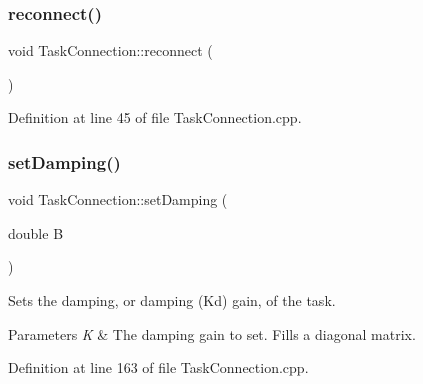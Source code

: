 \hypertarget{classocra__recipes_1_1TaskConnection_a416154f1cd736647003442d905b9862e}{}\label{classocra__recipes_1_1TaskConnection_a416154f1cd736647003442d905b9862e} 
\subsubsection{\texorpdfstring{reconnect()}{reconnect()}}
{\footnotesize\ttfamily void Task\+Connection\+::reconnect (\begin{DoxyParamCaption}{ }\end{DoxyParamCaption})}



Definition at line 45 of file Task\+Connection.\+cpp.

\hypertarget{classocra__recipes_1_1TaskConnection_a4f9c4b7b99c41c817b5c9448464b84bc}{}\label{classocra__recipes_1_1TaskConnection_a4f9c4b7b99c41c817b5c9448464b84bc} 
\subsubsection{\texorpdfstring{set\+Damping()}{setDamping()}\hspace{0.1cm}{\footnotesize\ttfamily [1/3]}}
{\footnotesize\ttfamily void Task\+Connection\+::set\+Damping (\begin{DoxyParamCaption}\item[{double}]{B }\end{DoxyParamCaption})}

Sets the damping, or damping (Kd) gain, of the task. 
\begin{DoxyParams}{Parameters}
{\em K} & The damping gain to set. Fills a diagonal matrix. \\
\hline
\end{DoxyParams}


Definition at line 163 of file Task\+Connection.\+cpp.

\hypertarget{classocra__recipes_1_1TaskConnection_ae831590f6b0139cfaff4e54286dc4438}{}\label{classocra__recipes_1_1TaskConnection_ae831590f6b0139cfaff4e54286dc4438} 
